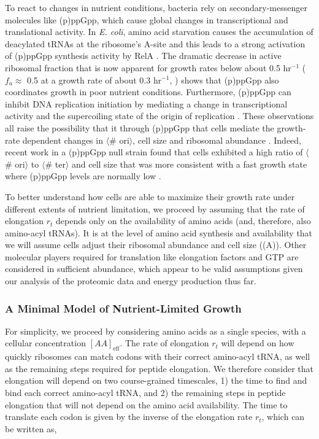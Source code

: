 To react to changes in nutrient conditions, bacteria rely on secondary-messenger
molecules like (p)ppGpp, which cause global changes in transcriptional and
translational activity.  In \textit{E. coli}, amino acid starvation causes the
accumulation of deacylated tRNAs at the ribosome's A-site and this leads to a
strong activation of (p)ppGpp synthesis activity by RelA \citep{hauryliuk2015}.
The dramatic decrease in active ribosomal fraction that is now apparent for
growth rates below about 0.5 hr$^{-1}$ ($f_a \approx$ 0.5 at a growth rate of
about 0.3 hr$^{-1}$, \cite{dai2016}) shows that (p)ppGpp also coordinates growth
in poor nutrient conditions. Furthermore, (p)ppGpp can inhibit DNA replication
initiation by mediating a change in transcriptional activity and the
supercoiling state of the origin of replication \citep{kraemer2019}. These
observations all raise the possibility that it through (p)ppGpp that cells
mediate the growth-rate dependent changes in $\langle$\# ori$\rangle$, cell size
and ribosomal abundance \citep{zhu2019, Buke2020}. Indeed, recent work in a
(p)ppGpp null strain found that cells exhibited a high ratio of $\langle$\#
ori$\rangle$ to $\langle$\# ter$\rangle$ and cell size that was more consistent
with a fast growth state where (p)ppGpp levels are normally low
\citep{fernandezcoll2020}.

To better understand how cells are able to maximize their growth rate under
different extents of nutrient limitation, we proceed by assuming that the rate
of elongation $r_t$ depends only on the availability of amino acids (and,
therefore, also amino-acyl tRNAs). It is at the level of amino acid synthesis
and availability that we will assume cells adjust their ribosomal abundance and
cell size ((A)). Other molecular players required for translation like elongation
factors and GTP are considered in sufficient abundance, which appear to be valid
assumptions given our analysis of the proteomic data and energy production thus
far.


\subsubsection{A Minimal Model of Nutrient-Limited Growth}

For simplicity, we proceed by considering amino acids as a single species, with a cellular
concentration $[AA]_{\text{eff}}$. The rate of elongation $r_t$ will depend on
how quickly ribosomes can match codons with their correct amino-acyl tRNA, as
well as the remaining steps required for peptide elongation. We therefore
consider that elongation will depend on two course-grained timescales, 1) the
time to find and bind each correct amino-acyl tRNA, and 2) the remaining steps
in peptide elongation that will not depend on the amino acid availability. The
time to translate each codon is given by the inverse of the elongation rate
$r_t$, which can be written as,

